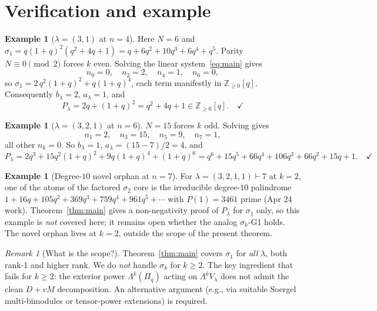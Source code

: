 \documentclass[11pt]{article}
\theoremstyle{plain}
\theoremstyle{definition}
\newtheorem{example}[theorem]{Example}
\theoremstyle{remark}
\newtheorem{remark}[theorem]{Remark}
\newcommand{\Z}{\mathbb{Z}}
\newcommand{\Pibs}{\Pi_q}
\newcommand{\Vlam}{V_\lambda}
\begin{document}
\section{Verification and example}

\begin{example}[$\lambda = (3,1)$ at $n = 4$]
Here $N = 6$ and $\sigma_1 = q(1+q)^2(q^2 + 4q + 1) = q + 6q^2 + 10q^3 + 6q^4 + q^5$. Parity $N \equiv 0 \pmod 2$ forces $k$ even. Solving the linear system~\eqref{eq:main} gives
\[
n_0 = 0, \quad n_2 = 2, \quad n_4 = 1, \quad n_6 = 0,
\]
so $\sigma_1 = 2\, q^2 (1+q)^2 + q (1+q)^4$, each term manifestly in $\Z_{\geq 0}[q]$. Consequently $b_\lambda = 2$, $a_\lambda = 1$, and
\[
P_\lambda = 2 q + (1+q)^2 = q^2 + 4q + 1 \in \Z_{\geq 0}[q]. \quad\checkmark
\]
\end{example}

\begin{example}[$\lambda = (3,2,1)$ at $n = 6$]
$N = 15$ forces $k$ odd. Solving gives
\[
n_1 = 2, \quad n_3 = 15, \quad n_5 = 9, \quad n_7 = 1,
\]
all other $n_k = 0$. So $b_\lambda = 1$, $a_\lambda = (15 - 7)/2 = 4$, and
\[
P_\lambda = 2 q^3 + 15 q^2 (1+q)^2 + 9 q (1+q)^4 + (1+q)^6 = q^6 + 15 q^5 + 66 q^4 + 106 q^3 + 66 q^2 + 15 q + 1. \quad\checkmark
\]
\end{example}

\begin{example}[Degree-$10$ novel orphan at $n=7$]
For $\lambda = (3,2,1,1) \vdash 7$ at $k=2$, one of the atoms of the factored $\sigma_2$ core is the irreducible degree-$10$ palindrome $1 + 16q + 105q^2 + 369q^3 + 759 q^4 + 961 q^5 + \cdots$ with $P(1) = 3461$ prime (Apr 24 work). Theorem~\ref{thm:main} gives a non-negativity proof of $P_\lambda$ for $\sigma_1$ only, so this example is \emph{not} covered here; it remains open whether the analog $\sigma_k$-G1 holds. The novel orphan lives at $k = 2$, outside the scope of the present theorem.
\end{example}

\begin{remark}[What is the scope?]
Theorem~\ref{thm:main} covers $\sigma_1$ for \emph{all} $\lambda$, both rank-1 and higher rank. We do \emph{not} handle $\sigma_k$ for $k \geq 2$. The key ingredient that fails for $k \geq 2$: the exterior power $\Lambda^k(\Pibs)$ acting on $\Lambda^k \Vlam$ does not admit the clean $D + vM$ decomposition. An alternative argument (e.g., via suitable Soergel multi-bimodules or tensor-power extensions) is required.
\end{remark}
\end{document}
